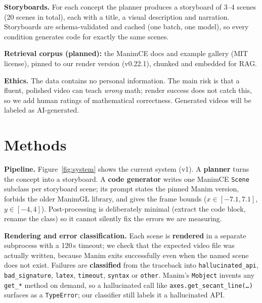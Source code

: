 \documentclass[11pt]{article}
\begin{document}
\textbf{Storyboards.} For each concept the planner produces a storyboard of 3--4 scenes (20 scenes in total), each with a title, a visual description and narration.
Storyboards are schema-validated and cached (one batch, one model), so every condition generates code for exactly the same scenes.

\textbf{Retrieval corpus (planned):} the ManimCE docs and example gallery (MIT license), pinned to our render version (v0.22.1), chunked and embedded for RAG.

\textbf{Ethics.} The data contains no personal information. The main risk is that a fluent, polished video can teach \emph{wrong} math; render success does not catch this, so we add human ratings of mathematical correctness. Generated videos will be labeled as AI-generated.

\section{Methods}

\textbf{Pipeline.} Figure~\ref{fig:system} shows the current system (v1).
A \textbf{planner} turns the concept into a storyboard. A \textbf{code generator} writes one ManimCE \texttt{Scene} subclass per storyboard scene; its prompt states the pinned Manim version, forbids the older ManimGL library, and gives the frame bounds ($x\in[-7.1,7.1]$, $y\in[-4,4]$).
Post-processing is deliberately minimal (extract the code block, rename the class) so it cannot silently fix the errors we are measuring.

\textbf{Rendering and error classification.} Each scene is \textbf{rendered} in a separate subprocess with a 120\,s timeout; we check that the expected video file was actually written, because Manim exits successfully even when the named scene does not exist.
Failures are \textbf{classified} from the traceback into \texttt{hallucinated\_api}, \texttt{bad\_signature}, \texttt{latex}, \texttt{timeout}, \texttt{syntax} or \texttt{other}.
Manim's \texttt{Mobject} invents any \texttt{get\_*} method on demand, so a hallucinated call like \texttt{axes.get\_secant\_line(\ldots)} surfaces as a \texttt{TypeError}; our classifier still labels it a hallucinated API.
\end{document}
